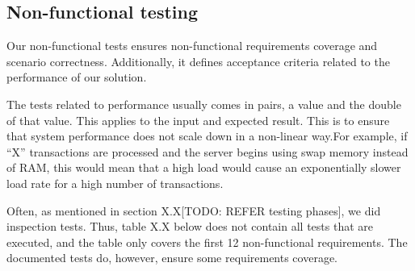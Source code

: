 \subsection{Non-functional testing}
Our non-functional tests ensures non-functional requirements coverage
and scenario correctness. Additionally, it defines acceptance criteria
related to the performance of our solution.

The tests related to performance usually comes in pairs, a value and the
double of that value. This applies to the input and expected result.
This is to ensure that system performance does not scale down in a
non-linear way.For example, if ``X''
transactions are processed and the server begins using swap memory
instead of RAM, this would mean that a high load would cause an
exponentially slower load rate for a high number of transactions.

Often, as mentioned in section X.X[TODO: REFER testing phases], we did
inspection tests. Thus, table X.X below does not contain all tests that
are executed, and the table only covers the first 12 non-functional
requirements. The documented tests do, however, ensure some
requirements coverage.

